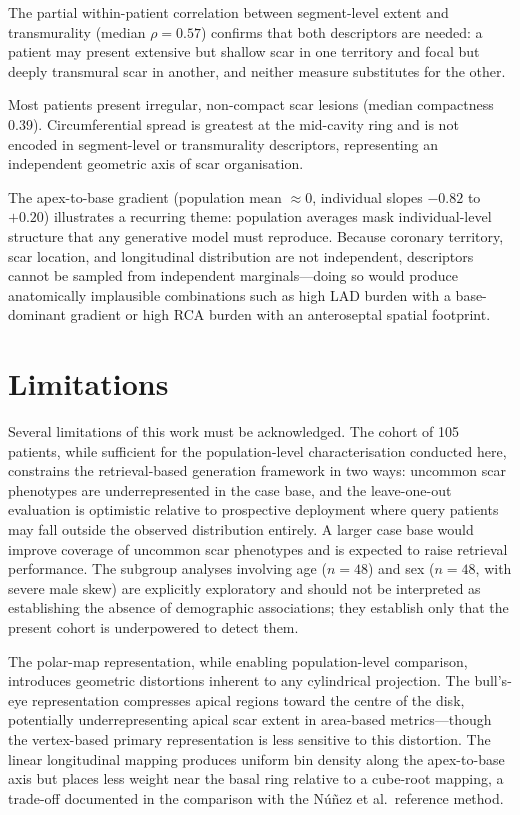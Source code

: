 The partial within-patient correlation between segment-level extent and transmurality (median
$\rho = 0.57$) confirms that both descriptors are needed: a patient may present extensive but
shallow scar in one territory and focal but deeply transmural scar in another, and neither
measure substitutes for the other.

Most patients present irregular, non-compact scar lesions (median compactness 0.39).
Circumferential spread is greatest at the mid-cavity ring and is not encoded in segment-level
or transmurality descriptors, representing an independent geometric axis of scar
organisation.

The apex-to-base gradient (population mean $\approx 0$, individual slopes $-0.82$ to
$+0.20$) illustrates a recurring theme: population averages mask individual-level structure
that any generative model must reproduce. Because coronary territory, scar location, and
longitudinal distribution are not independent, descriptors cannot be sampled from
independent marginals---doing so would produce anatomically implausible combinations
such as high LAD burden with a base-dominant gradient or high RCA burden with an
anteroseptal spatial footprint.

\section{Limitations}

Several limitations of this work must be acknowledged. The cohort of 105 patients, while sufficient for the population-level characterisation
conducted here, constrains the retrieval-based generation framework in two ways: uncommon scar
phenotypes are underrepresented in the case base, and the leave-one-out evaluation is
optimistic relative to prospective deployment where query patients may fall outside the
observed distribution entirely. A larger case base would improve coverage of uncommon
scar phenotypes and is expected to raise retrieval performance. The subgroup analyses involving age ($n = 48$) and sex
($n = 48$, with severe male skew) are explicitly exploratory and should not be interpreted as
establishing the absence of demographic associations; they establish only that the present
cohort is underpowered to detect them.

The polar-map representation, while enabling population-level comparison, introduces
geometric distortions inherent to any cylindrical projection. The bull's-eye representation
compresses apical regions toward the centre of the disk, potentially underrepresenting apical
scar extent in area-based metrics---though the vertex-based primary representation is less
sensitive to this distortion. The linear longitudinal mapping produces uniform bin density
along the apex-to-base axis but places less weight near the basal ring relative to a cube-root
mapping, a trade-off documented in the comparison with the N\'{u}\~{n}ez et al.\ reference
method.

